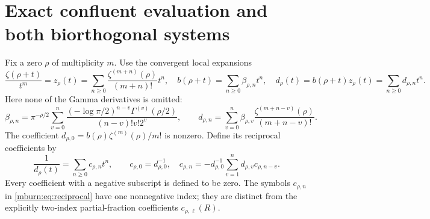 \documentclass[11pt]{article}
\begin{document}
\section{Exact confluent evaluation and both biorthogonal systems}

Fix a zero $\rho$ of multiplicity $m$. Use the convergent local
expansions
\begin{equation}\label{mburn:eq:local}
 \frac{\zeta(\rho+t)}{t^m}=z_\rho(t)
  =\sum_{n\geq0}\frac{\zeta^{(m+n)}(\rho)}{(m+n)!}t^n,
 \quad b(\rho+t)=\sum_{n\geq0}\beta_{\rho,n}t^n,
 \quad d_\rho(t)=b(\rho+t)z_\rho(t)=\sum_{n\geq0}d_{\rho,n}t^n.
\end{equation}
Here none of the Gamma derivatives is omitted:
\begin{equation}\label{mburn:eq:gamma-coeff}
 \beta_{\rho,n}=\pi^{-\rho/2}
 \sum_{v=0}^n
 \frac{(-\log\pi/2)^{n-v}\Gamma^{(v)}(\rho/2)}
                   {(n-v)!v!2^v},\qquad
 d_{\rho,n}=\sum_{v=0}^n\beta_{\rho,v}
                  \frac{\zeta^{(m+n-v)}(\rho)}{(m+n-v)!}.
\end{equation}
The coefficient $d_{\rho,0}=b(\rho)\zeta^{(m)}(\rho)/m!$
is nonzero. Define its reciprocal coefficients by
\begin{equation}\label{mburn:eq:reciprocal}
 \frac1{d_\rho(t)}=\sum_{n\geq0}c_{\rho,n}t^n,\qquad
 c_{\rho,0}=d_{\rho,0}^{-1},\quad
 c_{\rho,n}=-d_{\rho,0}^{-1}
                    \sum_{v=1}^nd_{\rho,v}c_{\rho,n-v}.
\end{equation}
Every coefficient with a negative subscript is defined to be zero.
The symbols $c_{\rho,n}$ in \eqref{mburn:eq:reciprocal} have one
nonnegative index; they are distinct from the explicitly
two-index partial-fraction coefficients $c_{\rho,\ell}(R)$.
\end{document}
